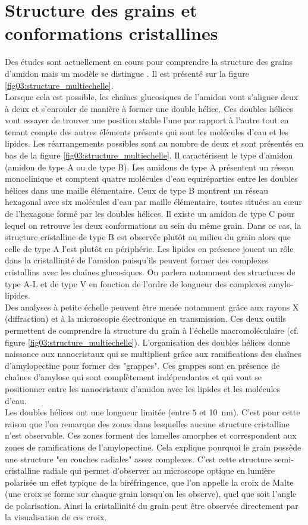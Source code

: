 \section*{Structure des grains et conformations cristallines}
	Des études sont actuellement en cours pour comprendre la structure des grains d'amidon mais un modèle se distingue \cite{bemiller_starch:_2009}. Il est présenté sur la figure \ref{fig03:structure_multiechelle}.
	\\Lorsque cela est possible, les chaînes glucosiques de l'amidon vont s'aligner deux à deux et s'enrouler de manière à former une double hélice. Ces doubles hélices vont essayer de trouver une position stable l'une par rapport à l'autre tout en tenant compte des autres éléments présents qui sont les molécules d'eau et les lipides. Les réarrangements possibles sont au nombre de deux et sont présentés en bas de la figure \ref{fig03:structure_multiechelle}. Il caractérisent le type d'amidon (amidon de type A ou de type B). Les amidons de type A présentent un réseau monoclinique et comptent quatre molécules d'eau equiréparties entre les doubles hélices dans une maille élémentaire. Ceux de type B montrent un réseau hexagonal avec six molécules d'eau par maille élémentaire, toutes situées au c\oe{}ur de l'hexagone formé par les doubles hélices. Il existe un amidon de type C pour lequel on retrouve les deux conformations au sein du même grain. Dans ce cas, la structure cristalline de type B est observée plutôt au milieu du grain alors que celle de type A l'est plutôt en périphérie. Les lipides en présence jouent un rôle dans la cristallinité de l'amidon puisqu'ils peuvent former des complexes cristallins avec les chaînes glucosiques. On parlera notamment des structures de type A-L et de type V en fonction de l'ordre de longueur des complexes amylo-lipides.
	\\Des analyses à petite échelle peuvent être menée notamment grâce aux rayons X (diffraction) et à la microscopie électronique en transmission. Ces deux outils permettent de comprendre la structure du grain à l'échelle macromoléculaire (cf. figure \ref{fig03:structure_multiechelle}). L'organisation des doubles hélices donne naissance aux nanocristaux qui se multiplient grâce aux ramifications des chaînes d'amylopectine pour former des "grappes". Ces grappes sont en présence de chaînes d'amylose qui sont complètement indépendantes et qui vont se positionner entre les nanocristaux d'amidon avec les lipides et les molécules d'eau.
	\\Les doubles hélices ont une longueur limitée (entre $5$ et \SI{10}{\nano\meter}). C'est pour cette raison que l'on remarque des zones dans lesquelles aucune structure cristalline n'est observable. Ces zones forment des lamelles amorphes et correspondent aux zones de ramifications de l'amylopectine. Cela explique pourquoi le grain possède une structure "en couches radiales" assez complexes. C'est cette structure semi-cristalline radiale qui permet d'observer au microscope optique en lumière polarisée un effet typique de la biréfringence, que l'on appelle la croix de Malte (une croix se forme sur chaque grain lorsqu'on les observe), quel que soit l'angle de polarisation. Ainsi la cristallinité du grain peut être observée directement par la visualisation de ces croix.
